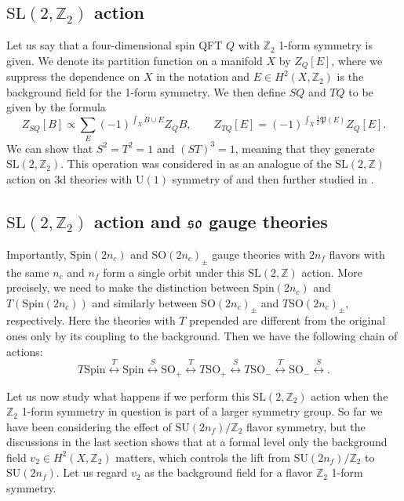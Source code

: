 \documentclass[12pt]{article}
\numberwithin{equation}{section}
\def\bZ{\mathbb{Z}}
\def\U{\mathrm{U}}
\def\SU{\mathrm{SU}}
\def\SO{\mathrm{SO}}
\def\so{\mathfrak{so}}
\def\Spin{\mathrm{Spin}}
\def\SL{\mathrm{SL}}
\begin{document}
\subsection{$\SL(2,\bZ_2)$ action}
Let us say that  a four-dimensional spin QFT $Q$ with $\bZ_2$ 1-form symmetry is given.
We denote its partition function on a manifold $X$ by $Z_Q[E]$, 
where we suppress the dependence on $X$ in the notation and $E\in H^2(X,\bZ_2)$ is the background field for the 1-form symmetry.
We then define $SQ$ and $TQ$ to be given by the formula \begin{equation}
Z_{SQ}[B] \propto \sum_{E} (-1)^{\int_X B\cup E} Z_Q{B},\qquad
Z_{TQ}[E]= (-1)^{\int_X \tfrac12 \mathfrak{P}(E)} Z_Q[E].
\end{equation}
We can show that $S^2=T^2=1$ and $(ST)^3=1$, meaning that they generate $\SL(2,\bZ_2)$.
This operation was considered in  \cite{Gaiotto:2014kfa} as an analogue of the $\SL(2,\bZ)$ action on 3d theories with $\U(1)$ symmetry of  \cite{Witten:2003ya} and then further studied in \cite{Bhardwaj:2020ymp}.

\subsection{$\SL(2,\bZ_2)$ action and $\so$ gauge theories}

Importantly, $\Spin(2n_c)$ and $\SO(2n_c)_\pm$  gauge theories with $2n_f$ flavors with the same $n_c$ and $n_f$ form a single orbit under this $\SL(2,\bZ)$ action.
More precisely, we need to make the distinction between $\Spin(2n_c)$ and $T(\Spin(2n_c))$ and  similarly between $\SO(2n_c)_\pm$ and $T\SO(2n_c)_\pm$, respectively.
Here the theories with $T$ prepended are different from the original ones only by its coupling to the background.
Then we have the following chain of actions: \begin{equation}
T\Spin \stackrel{T}{\longleftrightarrow} 
\Spin \stackrel{S}{\longleftrightarrow} 
\SO_+ \stackrel{T}{\longleftrightarrow} 
T\SO_+ \stackrel{S}{\longleftrightarrow} 
T\SO_- \stackrel{T}{\longleftrightarrow} 
\SO_- \stackrel{S}{\longleftrightarrow} .
\end{equation}

Let us now study what happens if we perform this $\SL(2,\bZ_2)$ action when the $\bZ_2$ 1-form symmetry in question is part of a larger symmetry group.
So far we have been considering the effect of $\SU(2n_f)/\bZ_2$ flavor symmetry,
but the discussions in the last section shows that at a formal level only the background field $v_2 \in H^2(X,\bZ_2)$ matters, which controls the lift from $\SU(2n_f)/\bZ_2$ to $\SU(2n_f)$.
Let us regard $v_2$ as the background field for a flavor $\bZ_2$ 1-form symmetry.
\end{document}
